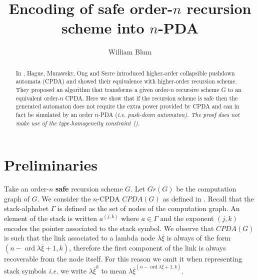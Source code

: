 \documentclass{article}
\author{William Blum}
\title{Encoding of safe order-$n$ recursion scheme into $n$-PDA}
\newcommand{\ord}{\mathop{\mathrm{ord}}}
\theoremstyle{remark}
\theoremstyle{definition}
\begin{document}
\maketitle
\begin{abstract}
In \cite{hague-sto07}, Hague, Murawsky, Ong and Serre introduced
higher-order collapsible pushdown automata (CPDA) and showed their equivalence with
higher-order recursion scheme.
They proposed an algorithm that transforms a given order-$n$ recursive scheme G to an equivalent order-$n$ CPDA. Here we show that if the recursion scheme is safe then the generated automaton does not require the extra power provided by CPDA and can in fact be simulated by an order $n$-PDA (\it{i.e.} push-down automaton). The proof does not make use of the type-homogeneity constraint (\cite{KNU02}).
\end{abstract}


\section{Preliminaries}

Take an order-$n$ {\bf safe} recursion scheme $G$. Let $Gr(G)$ be the computation graph of $G$.
We consider the $n$-CPDA $CPDA(G)$ as defined in \cite[Definition 5.2]{hague-sto07}.
Recall that the stack-alphabet $\Gamma$ is defined as the set of nodes of the computation graph.
An element of the stack is written $a^{(j,k)}$ where $a\in \Gamma$ and the exponent $(j,k)$
encodes the pointer associated to the stack symbol. We observe that $CPDA(G)$ is such that the link associated to a lambda node $\lambda \overline{\xi}$ is always of the form $(n-\ord{\lambda \overline{\xi}}+1, k)$, therefore the first component of the link is always recoverable from the node itself. For this reason we omit it when representing stack symbols {\it i.e.} we write $\lambda \overline{\xi}^{k}$ to mean $\lambda \overline{\xi}^{(n-\ord{\lambda \overline{\xi}}+1,k)}$.
\end{document}
